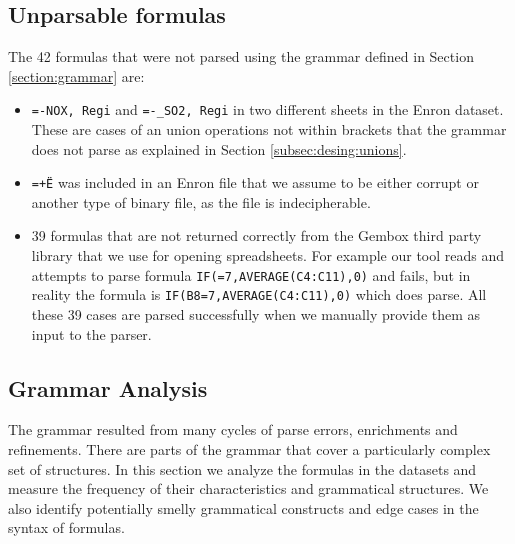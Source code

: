 \documentclass[conference]{IEEEtran}
\begin{document}
\subsection{Unparsable formulas}
The 42 formulas that were not parsed using the grammar defined in Section \ref{section:grammar} are:

\begin{itemize}
	\item \texttt{=-NOX, Regi} and \texttt{=-_SO2, Regi} in two different sheets in the Enron dataset. These are cases of an union operations not within brackets that the grammar does not parse as explained in Section \ref{subsec:desing:unions}.
	\item \texttt{=+Ë\textperthousand} was included in an Enron file that we assume to be either corrupt or another type of binary file, as the file is indecipherable.
	\item 39 formulas that are not returned correctly from the Gembox third party library that we use for opening spreadsheets. For example our tool reads and attempts to parse formula \texttt{IF(=7,AVERAGE(C4:C11),0)} and fails, but in reality the formula is \texttt{IF(B8=7,AVERAGE(C4:C11),0)} which does parse. All these 39 cases are parsed successfully when we manually provide them as input to the parser.
\end{itemize}

\subsection{Grammar Analysis}
The grammar resulted from many cycles of parse errors, enrichments and refinements. There are parts of the grammar that cover a particularly complex set of structures. In this section we analyze the formulas in the datasets and measure the frequency of their characteristics and grammatical structures. We also identify potentially smelly grammatical constructs and edge cases in the syntax of formulas.
\end{document}
